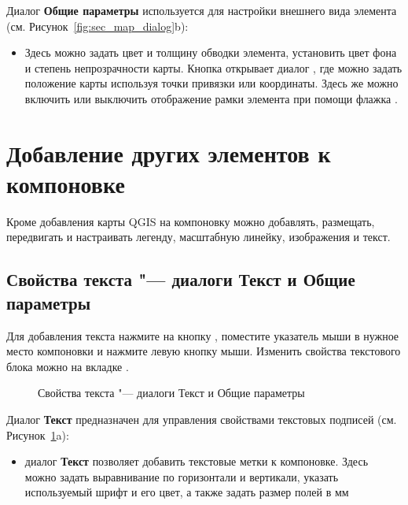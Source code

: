 
Диалог \textbf{Общие параметры} используется для настройки внешнего
вида элемента (см. Рисунок~\ref{fig:sec_map_dialog}b):

\begin{itemize}[label=--]
\item Здесь можно задать цвет и толщину обводки элемента, установить цвет
фона и степень непрозрачности карты. Кнопка  открывает
диалог , где можно задать положение карты
используя точки привязки или координаты. Здесь же можно включить или
выключить отображение рамки элемента при помощи флажка
.
\end{itemize}

\section{Добавление других элементов к компоновке}

Кроме добавления карты QGIS на компоновку можно добавлять, размещать,
передвигать и настраивать легенду, масштабную линейку, изображения и
текст.

\subsection{Свойства текста "--- диалоги Текст и Общие параметры}

Для добавления текста нажмите на кнопку
, поместите указатель мыши в
нужное место компоновки и нажмите левую кнопку мыши. Изменить свойства
текстового блока можно на вкладке .

\begin{figure}[ht]
\centering
   \hspace{1cm}
   \caption{Свойства текста "--- диалоги Текст и Общие параметры \wincaption}\label{fig:label_option}
\end{figure}


Диалог \textbf{Текст} предназначен для управления свойствами текстовых
подписей (см. Рисунок~\ref{fig:label_option}a):

\begin{itemize}[label=--]
\item диалог \textbf{Текст} позволяет добавить текстовые метки к
компоновке. Здесь можно задать выравнивание по горизонтали и вертикали,
указать используемый шрифт и его цвет, а также задать размер полей в мм
\end{itemize}

